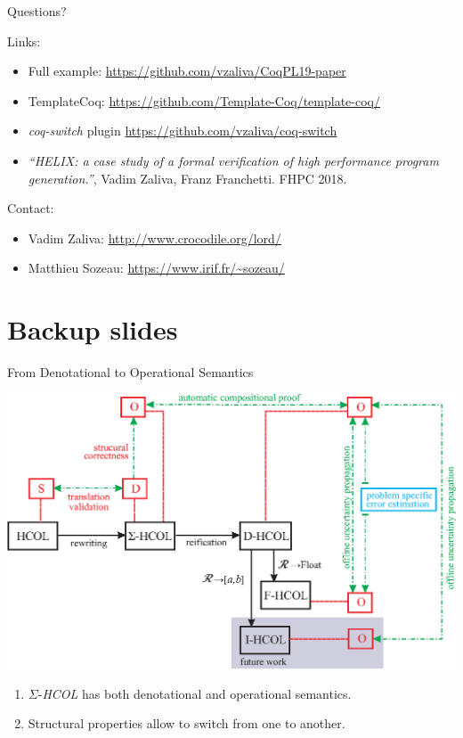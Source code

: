 \documentclass[aspectratio=169]{beamer}
\newcommand{\SHCOL}{\texorpdfstring{$\Sigma$-\emph{HCOL}}{Sigma-HCOL}}
\begin{document}
\begin{frame}{Questions?}

  Links:
  
  \begin{itemize}
  \item Full example: \url{https://github.com/vzaliva/CoqPL19-paper}
  \item TemplateCoq:
    \url{https://github.com/Template-Coq/template-coq/}
  \item \emph{coq-switch} plugin \url{https://github.com/vzaliva/coq-switch}
  \item \textit{``HELIX: a case
    study of a formal verification of high performance program
    generation.''}, Vadim Zaliva, Franz Franchetti. FHPC 2018. 
  \end{itemize}

  Contact:

  \begin{itemize}
  \item Vadim Zaliva: \url{http://www.crocodile.org/lord/}
  \item Matthieu Sozeau: \url{https://www.irif.fr/~sozeau/}
  \end{itemize}  
  
\end{frame}

\section{Backup slides}

\begin{frame}{From Denotational to Operational Semantics}
  \begin{center}
    \includegraphics[width=0.8\columnwidth]{figures/semantics.eps}
  \end{center}
  
  \begin{enumerate}
  \item {\SHCOL} has both denotational and operational semantics.
  \item Structural properties allow to switch from one to another.
  \end{enumerate}


\end{frame}
\end{document}
